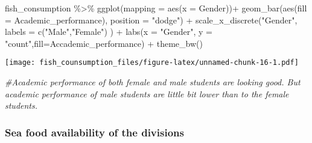 \documentclass[
]{article}
\newenvironment{Shaded}{\begin{snugshade}}{\end{snugshade}}
\newcommand{\AttributeTok}[1]{\textcolor[rgb]{0.77,0.63,0.00}{#1}}
\newcommand{\CommentTok}[1]{\textcolor[rgb]{0.56,0.35,0.01}{\textit{#1}}}
\newcommand{\FunctionTok}[1]{\textcolor[rgb]{0.00,0.00,0.00}{#1}}
\newcommand{\NormalTok}[1]{#1}
\newcommand{\SpecialCharTok}[1]{\textcolor[rgb]{0.00,0.00,0.00}{#1}}
\newcommand{\StringTok}[1]{\textcolor[rgb]{0.31,0.60,0.02}{#1}}
\begin{document}
\begin{Shaded}
\begin{Highlighting}[]
\NormalTok{fish\_consumption }\SpecialCharTok{\%\textgreater{}\%}
\FunctionTok{ggplot}\NormalTok{(}\AttributeTok{mapping =} \FunctionTok{aes}\NormalTok{(}\AttributeTok{x =}\NormalTok{ Gender))}\SpecialCharTok{+}
\FunctionTok{geom\_bar}\NormalTok{(}\FunctionTok{aes}\NormalTok{(}\AttributeTok{fill =}\NormalTok{ Academic\_performance), }\AttributeTok{position =} \StringTok{"dodge"}\NormalTok{) }\SpecialCharTok{+}
\FunctionTok{scale\_x\_discrete}\NormalTok{(}\StringTok{"Gender"}\NormalTok{, }\AttributeTok{labels =} \FunctionTok{c}\NormalTok{(}\StringTok{"Male"}\NormalTok{,}\StringTok{"Female"}\NormalTok{) ) }\SpecialCharTok{+}
\FunctionTok{labs}\NormalTok{(}\AttributeTok{x =} \StringTok{"Gender"}\NormalTok{, }\AttributeTok{y =} \StringTok{"count"}\NormalTok{,}\AttributeTok{fill=}\StringTok{\textquotesingle{}Accademic\_performance\textquotesingle{}}\NormalTok{) }\SpecialCharTok{+}
\FunctionTok{theme\_bw}\NormalTok{()}
\end{Highlighting}
\end{Shaded}

\texttt{[image: fish\_counsumption\_files/figure-latex/unnamed-chunk-16-1.pdf]}

\begin{Shaded}
\begin{Highlighting}[]
\CommentTok{\#Academic performance of both female and male students are looking good. But academic performance of male students are little bit lower than to the female students. }
\end{Highlighting}
\end{Shaded}

\hypertarget{sea-food-availability-of-the-divisions}{%
\subsubsection{Sea food availability of the
divisions}\label{sea-food-availability-of-the-divisions}}
\end{document}
